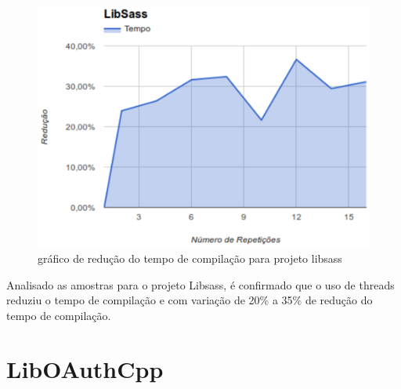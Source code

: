 \begin{figure}[h]
    \centering
        \includegraphics[keepaspectratio=true,scale=1]{figuras/libsass.eps}
    \caption{gráfico de redução do tempo de compilação para projeto libsass}
    \label{libsass}
\end{figure}

Analisado as amostras para o projeto Libsass, é confirmado que o
 uso de threads reduziu o tempo de compilação e com variação
 de 20\% a 35\% de redução do tempo de compilação.

\section{LibOAuthCpp}


